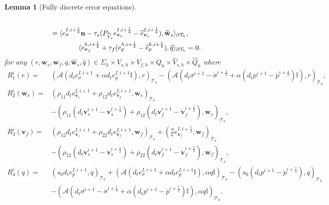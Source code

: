\documentclass[10pt,letterpaper]{amsart}
\theoremstyle{plain} %
\newtheorem{lemma}[theorem]{Lemma} %
\theoremstyle{remark} %
\newcommand{\vect}[1]{\mathbf{#1}}
\newcommand{\Id}{\mathbb{I}} %
\newcommand{\Ael}{\mathcal{A}} %
\newcommand{\Thprod}[2]{( #1, #2 )_{\mathcal{T}_h}}
\newcommand{\pThprod}[2]{\langle #1, #2 \rangle_{\partial \mathcal{T}_{h}}}
\begin{document}
\begin{lemma}[Fully discrete error equations]
\begin{subequations}
\begin{align}
        \\
        \notag = \pThprod{e_{\sigma}^{I,i+\frac 12} \vect{n} - \tau_{s} ({P_{\widehat{V}_s}} e_{\vect{v}_{s}}^{I,i+\frac 12} - \widehat{e}_{\vect{v}_{s}}^{I,i+\frac 12})}{\widehat{\vect{w}}_{s}}&, 
		\\
		\label{eq:fully-discrete-reduced-error-eq6}
		\pThprod{e_{\vect{v}_{f}}^{h,i+\frac 12} + \tau_f (e_p^{h,i+\frac 12} - \widehat{e}_p^{h,i+\frac 12})}{\widehat{q}} &= 0 .
	\end{align}
\end{subequations}
%
for any %
$(r, \vect{w}_s, \vect{w}_f, q, \widehat{\vect{w}}_s, \widehat{q}) \in \Sigma_{h} \times V_{s,h} \times V_{f,h} \times Q_{h} \times \widehat{V}_{s,h}\times \widehat{Q}_{h}$ where
%
\begin{align*}
	R_1^{i}(r)  = & \Thprod{\Ael(d_t e_{\sigma}^{I,i+1} + \alpha d_te_{p}^{I,i+1} \Id)}{r} - \Thprod{\Ael(d_t \sigma^{i+1} - \dot{\sigma}^{i+\frac 12} + \alpha (d_t{p}^{i+1} - \dot{p}^{i+\frac 12})\Id)}{r},
	\\
	R_2^{i}(\vect{w}_s)  = &\Thprod{\rho_{11}d_t e_{\vect{v}_{s}}^{I,i+1}+\rho_{12}d_t e_{\vect{v}_{f}}^{I,i+1}}{\vect{w}_{s}} 
    \\
    & - \Thprod{\rho_{11}(d_t{\vect{v}}_{s}^{i+1}-\dot{\vect{v}}_s^{i+\frac 12}) +\rho_{12}(d_t{\vect{v}}_{f}^{i+1}-\dot{\vect{v}}_f^{i+\frac 12}) }{\vect{w}_{s}},
	\\
	R_3^{i}(\vect{v}_f)  = &\Thprod{\rho_{12}d_t e_{\vect{v}_{s}}^{I,i+1}+\rho_{22}d_t e_{\vect{v}_{f}}^{I,i+1}}{\vect{w}_f} + \Thprod{\frac{\eta}{\kappa} e_{\vect{v}_{f}}^{I,i+\frac 12}}{\vect{w}_{f}} 
	\\
	& - \Thprod{\rho_{12}(d_t{\vect{v}}_{s}^{i+1} - \dot{\vect{v}}_{s}^{i+\frac 12})+\rho_{22}(d_t{\vect{v}}_{f}^{i+1} - \dot{\vect{v}}_{f}^{i+\frac 12})}{\vect{w}_{f}},
	\\
	R_4^{i}(q)  = &\Thprod{s_{0}d_t e_{p}^{I,i+1}}{q} + \Thprod{\Ael(d_t e_{\sigma}^{I,i+1}+\alpha d_t e_{p}^{I,i+1}\Id)}{\alpha q\Id} - \Thprod{s_{0}(d_t{p}^{i+1}-\dot{p}^{i+\frac 12})}{q} \\
	& - \Thprod{\Ael(d_t{\sigma}^{i+1}- \dot{\sigma}^{i+\frac 12}+\alpha (d_t{p}^{i+1} - \dot{p}^{i+\frac 12})\Id)}{\alpha q\Id} .
\end{align*}
\end{lemma}
%
\end{document}
